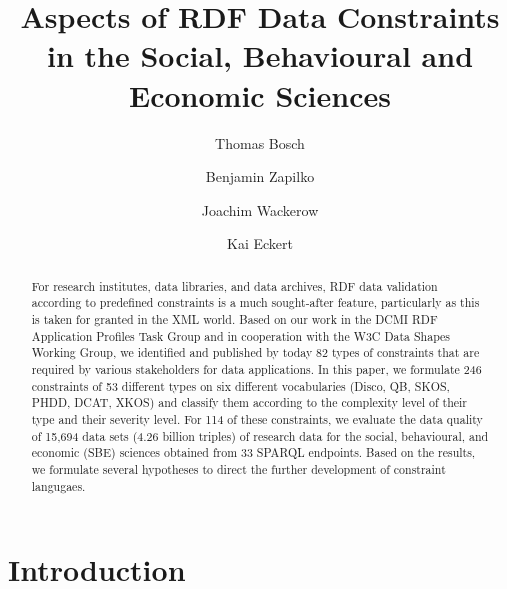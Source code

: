 \documentclass{llncs}
\newcommand{\ke}[1]{\todo[size=\small, color=red!40]{\textbf{Kai:} #1}}
\begin{document}
\renewcommand{\arraystretch}{1.3}
\title{Aspects of RDF Data Constraints in the Social, Behavioural and Economic Sciences}
\subtitle{}

%
\author{Thomas Bosch \and Benjamin Zapilko \and Joachim Wackerow \and Kai Eckert}
%
\authorrunning{} %
%

\maketitle              %

\begin{abstract}

For research institutes, data libraries, and data archives,
RDF data validation according to predefined constraints is a much sought-after feature, 
particularly as this is taken for granted in the XML world.
Based on our work in the DCMI RDF Application Profiles Task Group and in cooperation with the W3C Data Shapes Working Group, we identified and published by today 82 types of constraints that are required by various stakeholders for data applications.
In this paper, we formulate 246 constraints of 53 different types on six different vocabularies (Disco, QB, SKOS, PHDD, DCAT, XKOS) and classify them according to the complexity level of their type and their severity level. For 114 of these constraints, we evaluate the data quality of 15,694 data sets (4.26 billion triples) of research data for the social, behavioural, and economic (SBE) sciences obtained from 33 SPARQL endpoints. \ke{check numbers}
Based on the results, we formulate several hypotheses to direct the further development of constraint langugaes.


\end{abstract}

\section{Introduction}
\end{document}
